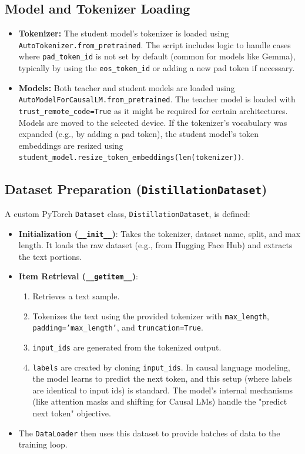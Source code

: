\documentclass{article}
\begin{document}
\subsection{Model and Tokenizer Loading}
\begin{itemize}
    \item \textbf{Tokenizer:} The student model's tokenizer is loaded using \texttt{AutoTokenizer.from\_pretrained}. The script includes logic to handle cases where \texttt{pad\_token\_id} is not set by default (common for models like Gemma), typically by using the \texttt{eos\_token\_id} or adding a new pad token if necessary.
    \item \textbf{Models:} Both teacher and student models are loaded using \texttt{AutoModelForCausalLM.from\_pretrained}. The teacher model is loaded with \texttt{trust\_remote\_code=True} as it might be required for certain architectures. Models are moved to the selected device. If the tokenizer's vocabulary was expanded (e.g., by adding a pad token), the student model's token embeddings are resized using \texttt{student\_model.resize\_token\_embeddings(len(tokenizer))}.
\end{itemize}

\subsection{Dataset Preparation (\texttt{DistillationDataset})}
A custom PyTorch \texttt{Dataset} class, \texttt{DistillationDataset}, is defined:
\begin{itemize}
    \item \textbf{Initialization (\texttt{\_\_init\_\_})}: Takes the tokenizer, dataset name, split, and max length. It loads the raw dataset (e.g., from Hugging Face Hub) and extracts the text portions.
    \item \textbf{Item Retrieval (\texttt{\_\_getitem\_\_})}:
        \begin{enumerate}
            \item Retrieves a text sample.
            \item Tokenizes the text using the provided tokenizer with \texttt{max\_length}, \texttt{padding='max\_length'}, and \texttt{truncation=True}.
            \item \texttt{input\_ids} are generated from the tokenized output.
            \item \texttt{labels} are created by cloning \texttt{input\_ids}. In causal language modeling, the model learns to predict the next token, and this setup (where labels are identical to input ids) is standard. The model's internal mechanisms (like attention masks and shifting for Causal LMs) handle the "predict next token" objective.
        \end{enumerate}
    \item The \texttt{DataLoader} then uses this dataset to provide batches of data to the training loop.
\end{itemize}
\end{document}
